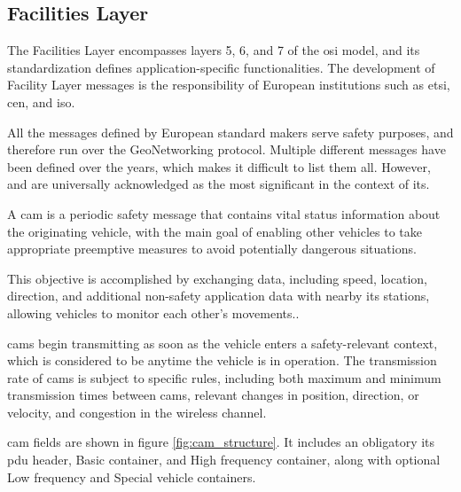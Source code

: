 \subsection[Facilities Layer]{Facilities Layer}
\label{subsec:Facilities}

The Facilities Layer encompasses layers 5, 6, and 7 of the \gls{osi} model, and its standardization defines application-specific functionalities\cite{festag_standards_2015}. The development of Facility Layer messages is the responsibility of European institutions such as \gls{etsi}, \gls{cen}, and \gls{iso}.

All the messages defined by European standard makers serve safety purposes, and therefore run over the GeoNetworking protocol\cite{festag_standards_2015}. Multiple different messages have been defined over the years\cite{festag_cooperative_2014}, which makes it difficult to list them all. However,  and  are universally acknowledged as the most significant in the context of \gls{its}.

A \gls{cam}\cite{etsi_intelligent_2019-2} is a periodic safety message that contains vital status information about the originating vehicle, with the main goal of enabling other vehicles to take appropriate preemptive measures to avoid potentially dangerous situations\cite{al-sultan_comprehensive_2014}.

This objective is accomplished by exchanging data, including speed, location, direction, and additional non-safety application data with nearby \gls{its} stations, allowing vehicles to monitor each other's movements.\cite{festag_standards_2015}.

\glspl{cam} begin transmitting as soon as the vehicle enters a safety-relevant context, which is considered to be anytime the vehicle is in operation.\cite{festag_cooperative_2014} The transmission rate of \glspl{cam} is subject to specific rules, including both maximum and minimum transmission times between \glspl{cam}, relevant changes in position, direction, or velocity, and congestion in the wireless channel\cite{festag_cooperative_2014}.

\gls{cam} fields are shown in figure \ref{fig:cam_structure}. It includes an obligatory \gls{its} \gls{pdu} header, Basic container, and High frequency container, along with optional Low frequency and Special vehicle containers.

